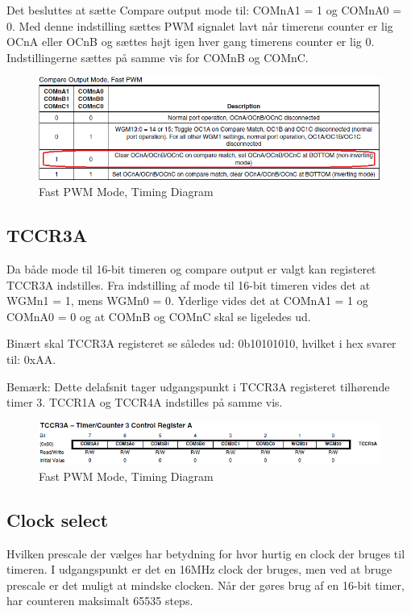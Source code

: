Det besluttes at sætte Compare output mode til:  COMnA1 = 1 og COMnA0 = 0.  Med denne indstilling sættes PWM signalet lavt når timerens counter er lig OCnA eller OCnB og sættes højt igen hver gang timerens counter er lig 0. Indstillingerne sættes på samme vis for COMnB og COMnC.

\begin{figure}[H]
	\centering
	\includegraphics[width=1.\textwidth]{Billeder/Timer/2_compare_output_mode.png}
	\caption{Fast PWM Mode, Timing Diagram}
	\label{fig:Timing_diagram}
\end{figure}

 

\subsection*{TCCR3A}
Da både mode til 16-bit timeren og compare output er valgt kan registeret TCCR3A indstilles. Fra indstilling af mode til 16-bit timeren vides det at WGMn1 = 1, mens WGMn0 = 0. Yderlige vides det at COMnA1 = 1 og COMnA0 = 0 og at COMnB og COMnC skal se ligeledes ud.

Binært skal TCCR3A registeret se således ud: 0b10101010, hvilket i hex svarer til: 0xAA. 

Bemærk: Dette delafsnit tager udgangspunkt i TCCR3A registeret tilhørende timer 3.  TCCR1A og TCCR4A indstilles på samme vis.

\begin{figure}[H]
	\centering
	\includegraphics[width=1.\textwidth]{Billeder/Timer/3_TCCT3A.png}
	\caption{Fast PWM Mode, Timing Diagram}
	\label{fig:Timing_diagram}
\end{figure}

\newpage

\subsection*{Clock select}
Hvilken prescale der vælges har betydning for hvor hurtig en clock der bruges til timeren. I udgangspunkt er det en 16MHz clock der bruges, men ved at bruge prescale er det muligt at mindske clocken. Når der gøres brug af en 16-bit timer, har counteren maksimalt 65535 steps. 

